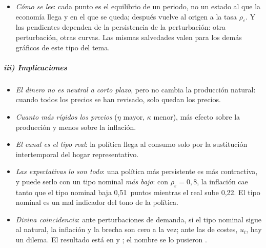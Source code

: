 \documentclass[11pt]{article}
\begin{document}
\begin{anotaciones}
\begin{itemize}
\item \emph{Cómo se lee}: cada punto es el equilibrio de un periodo, no un estado al que la economía llega y en el que se queda; después vuelve al origen a la tasa $\rho_\varepsilon$. Y las pendientes dependen de la persistencia de la perturbación: otra perturbación, otras curvas. Las mismas salvedades valen para los demás gráficos de este tipo del tema.
\end{itemize}
\end{anotaciones}

\subparagraph{iii) Implicaciones}
\begin{itemize}
\item \emph{El dinero no es neutral a corto plazo}, pero no cambia la producción natural: cuando todos los precios se han revisado, solo quedan los precios.
\item \emph{Cuanto más rígidos los precios} ($\eta$ mayor, $\kappa$ menor), más efecto sobre la producción y menos sobre la inflación.
\item \emph{El canal es el tipo real}: la política llega al consumo solo por la sustitución intertemporal del hogar representativo.
\item \emph{Las expectativas lo son todo}: una política más persistente es más contractiva, y puede serlo con un tipo nominal \emph{más bajo}: con $\rho_\varepsilon=0{,}8$, la inflación cae tanto que el tipo nominal baja 0,51~puntos mientras el real sube 0,22. El tipo nominal es un mal indicador del tono de la política.
\item \emph{Divina coincidencia}: ante perturbaciones de demanda, si el tipo nominal sigue al natural, la inflación y la brecha son cero a la vez; ante las de costes, $u_t$, hay un dilema. El resultado está en \textcite{GoodfriendKing1997New} y \textcite{RotembergWoodford1997Optimization}; el nombre se lo pusieron \textcite{BlanchardGali2007Real} .
\end{itemize}
\end{document}
